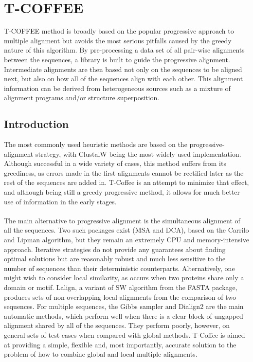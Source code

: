 \graphicspath{{chapters/images/}}
\chapter{T-COFFEE}
T-COFFEE method is broadly based on the popular progressive approach to multiple alignment but avoids the most serious pitfalls caused by the greedy nature of this algorithm.  
By pre-processing a data set of all pair-wise alignments between the sequences, a library is built to guide the progressive alignment. 
Intermediate alignments are then based not only on the sequences to be aligned next, but also on how all of the sequences align with each other. This alignment information can be derived from heterogeneous sources such as a mixture of alignment programs and/or structure superposition. 

\section{Introduction}
The most commonly used heuristic methods are based on the progressive-alignment strategy, with ClustalW being the most widely used implementation. 
Although successful in a wide variety of cases, this method suffers from its greediness, as errors made in the first alignments cannot be rectified later as the rest of the sequences are added in. 
T-Coffee is an attempt to minimize that effect, and although being still a greedy progressive method, it allows for much better use of information in the early stages.
\\
\\
\noindent
The main alternative to progressive alignment is the simultaneous alignment of all the sequences. Two such packages exist (MSA and DCA), based on the Carrilo and Lipman algorithm, but they remain an extremely CPU and memory-intensive approach. 
Iterative strategies do not provide any guarantees about finding optimal solutions but are reasonably robust and much less sensitive to the number of sequences than their deterministic counterparts.
Alternatively, one might wish to consider local similarity, as occurs when two proteins share only a domain or motif.
Lalign, a variant of SW algorithm from the FASTA package, produces sets of non-overlapping local alignments from the comparison of two sequences. 
For multiple sequences, the Gibbs sampler and Dialign2 are the main automatic methods, which perform well when there is a clear block of ungapped alignment shared by all of the sequences. 
They perform poorly, however, on general sets of test cases when compared with global methods. 
T-Coffee is aimed at providing a simple,  flexible and, most importantly, accurate solution to the problem of how to combine global and local multiple alignments. 

